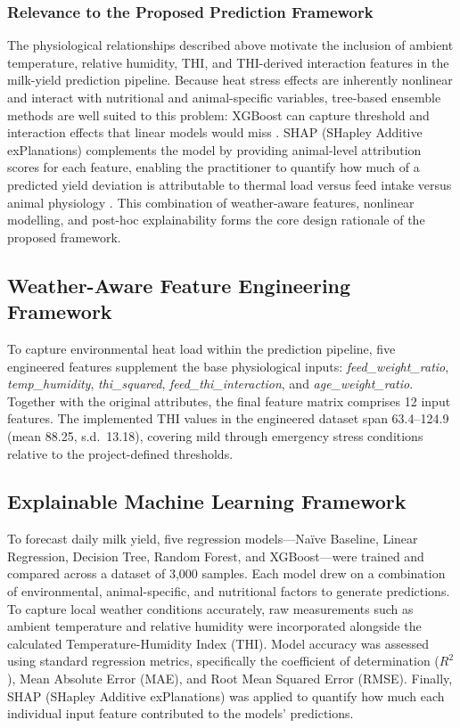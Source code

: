 \documentclass[conference]{IEEEtran}
\begin{document}
	\subsubsection{Relevance to the Proposed Prediction Framework}
	The physiological relationships described above motivate the inclusion of ambient temperature, relative humidity, THI, and THI-derived interaction features in the milk-yield prediction pipeline. Because heat stress effects are inherently nonlinear and interact with nutritional and animal-specific variables, tree-based ensemble methods are well suited to this problem: XGBoost can capture threshold and interaction effects that linear models would miss \cite{ref5}. SHAP (SHapley Additive exPlanations) complements the model by providing animal-level attribution scores for each feature, enabling the practitioner to quantify how much of a predicted yield deviation is attributable to thermal load versus feed intake versus animal physiology \cite{ref3}. This combination of weather-aware features, nonlinear modelling, and post-hoc explainability forms the core design rationale of the proposed framework.

	\subsection{Weather-Aware Feature Engineering Framework}
	To capture environmental heat load within the prediction pipeline, five engineered features supplement the base physiological inputs: \textit{feed\_weight\_ratio}, \textit{temp\_humidity}, \textit{thi\_squared}, \textit{feed\_thi\_interaction}, and \textit{age\_weight\_ratio}. Together with the original attributes, the final feature matrix comprises 12 input features. The implemented THI values in the engineered dataset span 63.4--124.9 (mean 88.25, s.d.\ 13.18), covering mild through emergency stress conditions relative to the project-defined thresholds.
	
	\subsection{Explainable Machine Learning Framework}
To forecast daily milk yield, five regression models—Naïve Baseline, Linear Regression, Decision Tree, Random Forest, and XGBoost—were trained and compared across a dataset of 3,000 samples. Each model drew on a combination of environmental, animal-specific, and nutritional factors to generate predictions. To capture local weather conditions accurately, raw measurements such as ambient temperature and relative humidity were incorporated alongside the calculated Temperature-Humidity Index (THI). Model accuracy was assessed using standard regression metrics, specifically the coefficient of determination ($R^2$), Mean Absolute Error (MAE), and Root Mean Squared Error (RMSE). Finally, SHAP (SHapley Additive exPlanations) was applied to quantify how much each individual input feature contributed to the models' predictions.
	
\end{document}
